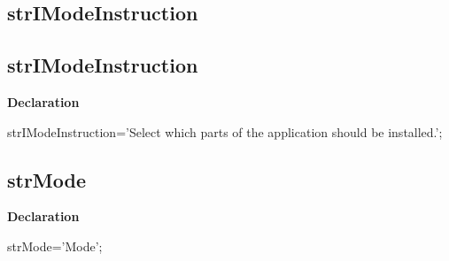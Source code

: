 \documentclass{report}
\newif\ifpdf
\begin{document}
\subsection*{\large{\textbf{strIModeInstruction}}\normalsize\hspace{1ex}\hrulefill}
\else
\subsection*{strIModeInstruction}
\fi
\label{trstrings-strIModeInstruction}
\begin{list}{}{
\setlength{\itemindent}{0cm}
\setlength{\listparindent}{0cm}
\setlength{\leftmargin}{\evensidemargin}
\addtolength{\leftmargin}{\tmplength}
\settowidth{\labelsep}{X}
\addtolength{\leftmargin}{\labelsep}
\setlength{\labelwidth}{\tmplength}
}
\item[\textbf{Declaration}\hfill]
\ifpdf
\begin{flushleft}
\fi
\begin{ttfamily}
strIModeInstruction='Select which parts of the application should be installed.';\end{ttfamily}

\ifpdf
\end{flushleft}
\fi

\end{list}
\ifpdf
\subsection*{\large{\textbf{strMode}}\normalsize\hspace{1ex}\hrulefill}
\else
\subsection*{strMode}
\fi
\label{trstrings-strMode}
\begin{list}{}{
\setlength{\itemindent}{0cm}
\setlength{\listparindent}{0cm}
\setlength{\leftmargin}{\evensidemargin}
\addtolength{\leftmargin}{\tmplength}
\settowidth{\labelsep}{X}
\addtolength{\leftmargin}{\labelsep}
\setlength{\labelwidth}{\tmplength}
}
\item[\textbf{Declaration}\hfill]
\ifpdf
\begin{flushleft}
\fi
\begin{ttfamily}
strMode='Mode';\end{ttfamily}

\ifpdf
\end{flushleft}
\fi

\end{list}
\ifpdf
\end{document}
